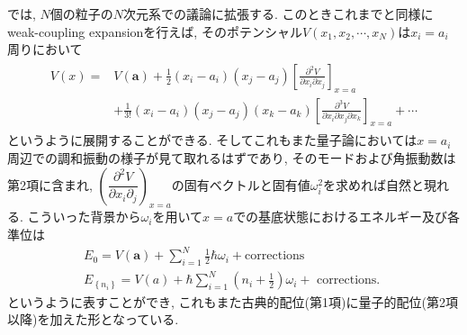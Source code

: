 \documentclass[dvipdfmx,11pt,a4paper,oneside,openany]{jsbook}
\begin{document}
では, $N$個の粒子の$N$次元系での議論に拡張する. このときこれまでと同様にweak-coupling expansionを行えば, そのポテンシャル$V(x_1,x_2,\cdots,x_N)$は$x_i=a_i$周りにおいて
\setcounter{equation}{15}
\begin{align}
    \begin{aligned}
        V(x)= & V(\bm{a})+\frac{1}{2}\left(x_{i}-a_{i}\right)\left(x_{j}-a_{j}\right)\left[\frac{\partial^{2} V}{\partial x_{i} \partial x_{j}}\right]_{x=a}                                       \\
              & +\frac{1}{3 !}\left(x_{i}-a_{i}\right)\left(x_{j}-a_{j}\right)\left(x_{k}-a_{k}\right)\left[\frac{\partial^{3} V}{\partial x_{i} \partial x_{j} \partial x_k} \right]_{x=a}+\cdots
    \end{aligned}
\end{align}
というように展開することができる. そしてこれもまた量子論においては$x=a_i$周辺での調和振動の様子が見て取れるはずであり, そのモードおよび角振動数は第2項に含まれ, $\left(\dfrac{\partial^2 V}{\partial x_i\partial_j}\right)_{x=a}$の固有ベクトルと固有値$\omega_i^2$を求めれば自然と現れる. こういった背景から$\omega_i$を用いて$x=a$での基底状態におけるエネルギー及び各準位は
\begin{align}
    E_0=V(\bm{a})+\sum_{i=1}^{N}\frac{1}{2}\hbar\omega_i+\text{corrections} \\
    E_{\left\{n_{i}\right\}}=V(a)+\hbar \sum_{i=1}^{N}\left(n_{i}+\frac{1}{2}\right) \omega_{i}+\text { corrections. }
\end{align}
というように表すことができ, これもまた古典的配位(第1項)に量子的配位(第2項以降)を加えた形となっている.
\end{document}
